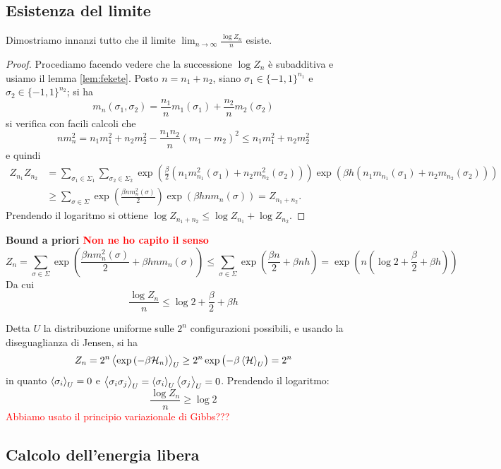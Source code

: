 \subsection{Esistenza del limite}
Dimostriamo innanzi tutto che il limite $ \lim_{n\to\infty} \frac{\log Z_n}{n} $ esiste.
\begin{proof}
    Procediamo facendo vedere che la successione $ \log Z_n $ è subadditiva e usiamo il lemma \ref{lem:fekete}.
    Posto $ n = n_1 + n_2 $, siano $ \sigma_1 \in \{-1,1\}^{n_1} $ e $ \sigma_2 \in \{-1,1\}^{n_2} $; si ha
    \[ m_n(\sigma_1,\sigma_2) = \frac{n_1}{n} m_1(\sigma_1) + \frac{n_2}{n} m_2(\sigma_2) \]
    si verifica con facili calcoli che
    \[ n m_n^2 = n_1 m_1^2 + n_2 m_2^2 - \frac{n_1 n_2}{n} (m_1-m_2)^2 \leq n_1 m_1^2 + n_2 m_2^2 \]
    e quindi
    \begin{align*}
        Z_{n_1} Z_{n_2} & = \sum_{\sigma_1\in\Sigma_1} \sum_{\sigma_2\in\Sigma_2} \exp\left(\frac{\beta}{2} \left(n_1 m_{n_1}^2(\sigma_1) + n_2 m_{n_2}^2(\sigma_2) \right) \right) \exp\left(\beta h\left(n_1 m_{n_1}(\sigma_1) + n_2 m_{n_2}(\sigma_2) \right) \right) \\
                        & \geq \sum_{\sigma\in\Sigma} \exp\left(\frac{\beta n m_n^2(\sigma)}{2} \right) \exp\left(\beta h n m_n(\sigma) \right) = Z_{n_1+n_2}.
    \end{align*}
    Prendendo il logaritmo si ottiene $ \log Z_{n_1+n_2} \leq \log Z_{n_1} + \log Z_{n_2} $.
\end{proof}

\textbf{Bound a priori \textcolor{red}{Non ne ho capito il senso}}
\[ Z_n = \sum_{\sigma \in \Sigma} \exp\left( \frac{\beta n m_n^2(\sigma)}{2} + \beta h n m_n(\sigma) \right) \leq \sum_{\sigma \in \Sigma} \exp\left(  \frac{\beta n}{2} + \beta n h \right) = \exp\left( n \left( \log 2 + \frac{\beta}{2} + \beta h \right) \right) \]
Da cui
\[ \frac{\log Z_n}{n} \leq \log 2 + \frac{\beta}{2} + \beta h \]

Detta $ U $ la distribuzione uniforme sulle $ 2^n $ configurazioni possibili, e usando la diseguaglianza di Jensen, si ha
\[ Z_n = 2^n \left< \exp\left(-\beta\mathcal{H}_n\right) \right>_U \geq 2^n \exp\left( -\beta \left< \mathcal{H} \right>_U \right) = 2^n \]
in quanto $ \left< \sigma_i \right>_U = 0 $ e $ \left< \sigma_i\sigma_j \right>_U = \left< \sigma_i \right>_U\left< \sigma_j \right>_U = 0 $. Prendendo il logaritmo:
\[ \frac{\log Z_n}{n} \geq \log 2 \]
\textcolor{red}{Abbiamo usato il principio variazionale di Gibbs???}

\subsection{Calcolo dell'energia libera}
